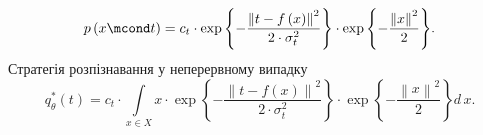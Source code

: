 \begin{equation*}
  p\left( x \mcond t \right)
  = c_t
    \cdot \exp{\left\{ - \frac{\left\| t - f\left( x \right) \right\|^2}
                              {2 \cdot \sigma_t^2} \right\}}
    \cdot \exp{\left\{ - \frac{\left\| x \right\|^2}{2} \right\}}.
\end{equation*}
Стратегія розпізнавання у неперервному випадку
\begin{equation*}
  q^*_{\theta}\left( t \right)
  = c_t
    \cdot \int\limits_{x \in X}
      x
      \cdot \exp{\left\{ - \frac{\left\| t - f\left( x \right) \right\|^2}
                                {2 \cdot \sigma_t^2} \right\}}
      \cdot \exp{\left\{ - \frac{\left\| x \right\|^2}{2} \right\}}
    d\,x.
\end{equation*}
